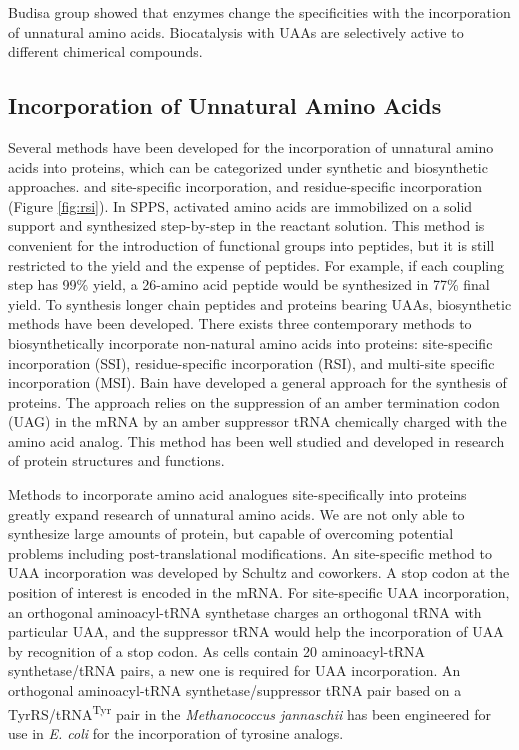 \begin{refsection}
Budisa group showed that enzymes change the specificities with the
incorporation of unnatural amino acids\cite{Budisa2006}. Biocatalysis with UAAs
are selectively active to different chimerical compounds. 

\subsection{Incorporation of Unnatural Amino Acids} 
\label{sec:rsi-intro}

Several methods have been developed for the incorporation of unnatural amino
acids into proteins, which can be categorized under synthetic and biosynthetic
approaches.  and  site-specific
incorporation,\cite{Cellitti2008,Hassan2008} and residue-specific incorporation
(Figure \ref{fig:rsi})\cite{Johnson2010}.  In SPPS, activated amino acids are
immobilized on a solid support and synthesized step-by-step in the reactant
solution. This method is convenient for the introduction of functional groups
into peptides, but it is still restricted to the yield and the expense of
peptides. For example, if each coupling step has 99\% yield, a 26-amino acid
peptide would be synthesized in 77\% final yield.  To synthesis longer chain
peptides and proteins bearing UAAs, biosynthetic methods have been developed.
There exists three contemporary methods to biosynthetically incorporate
non-natural amino acids into proteins: site-specific incorporation (SSI),
residue-specific incorporation (RSI), and multi-site specific incorporation
(MSI). Bain  have developed a general approach for the  synthesis of proteins\cite{Bain1991}.  The approach relies on the
suppression of an amber termination codon (UAG) in the mRNA by an amber
suppressor tRNA chemically charged with the amino acid analog. This method has
been well studied and developed in research of protein structures and
functions\cite{Martoglio1995,Eichler1997}.

Methods to incorporate amino acid analogues site-specifically into proteins
 greatly expand research of unnatural amino acids. We are not
only able to synthesize large amounts of protein, but capable of overcoming
potential problems including post-translational modifications. An  site-specific method to UAA incorporation was developed by Schultz and
coworkers\cite{Wang2001,Wang2002}. A stop codon at the position of interest is
encoded in the mRNA. For  site-specific UAA incorporation, an
orthogonal aminoacyl-tRNA synthetase charges an orthogonal tRNA with particular
UAA, and the suppressor tRNA would help the incorporation of UAA by recognition
of a stop codon. As cells contain 20 aminoacyl-tRNA synthetase/tRNA pairs, a
new one is required for UAA incorporation. An orthogonal aminoacyl-tRNA
synthetase/suppressor tRNA pair based on a TyrRS/tRNA\textsuperscript{Tyr} pair
in the \emph{Methanococcus jannaschii} has been engineered for use in \emph{E.
coli} for the incorporation of tyrosine analogs\cite{Wang2001}.


\end{refsection}
